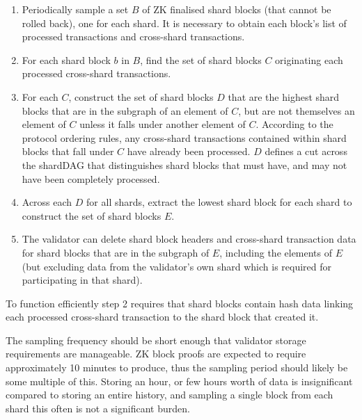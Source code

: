 \begin{enumerate}
	\item Periodically sample a set $B$ of ZK finalised shard blocks (that cannot be rolled back), one for each shard. 
	It is necessary to obtain each block’s list of processed transactions and cross-shard transactions.
	\item For each shard block $b$ in $B$, find the set of shard blocks $C$ originating each processed cross-shard transactions. 
	\item For each $C$, construct the set of shard blocks $D$ that are the highest shard blocks that are in the subgraph of an element of $C$, but are not themselves an element of $C$ unless it falls under another element of $C$. 
	According to the protocol ordering rules, any cross-shard transactions contained within shard blocks that fall under $C$ have already been processed. 
	$D$ defines a cut across the shardDAG that distinguishes shard blocks that must have, and may not have been completely processed.
	\item Across each $D$ for all shards, extract the lowest shard block for each shard to construct the set of shard blocks $E$.
	\item The validator can delete shard block headers and cross-shard transaction data for shard blocks that are in the subgraph of $E$, including the elements of $E$ (but excluding data from the validator’s own shard which is required for participating in that shard).
\end{enumerate}

To function efficiently step 2 requires that shard blocks contain hash data linking each processed cross-shard transaction to the shard block that created it.

The sampling frequency should be short enough that validator storage requirements are manageable. ZK block proofs are expected to require approximately 10 minutes to produce, thus the sampling period should likely be some multiple of this. 
Storing an hour, or few hours worth of data is insignificant compared to storing an entire history, and sampling a single block from each shard this often is not a significant burden.